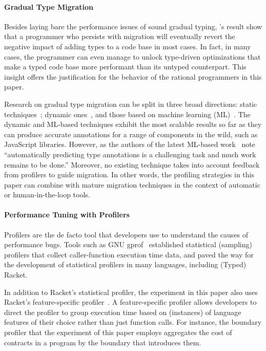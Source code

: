 \paragraph{Gradual Type Migration} Besides laying bare the performance
issues of sound gradual typing, \citet{gtnffvf-jfp-2019}'s result show
that a programmer who persists with migration will eventually revert the
negative impact of adding types to a code base in most cases. In fact, in
many cases, the programmer can even manage to unlock type-driven
optimizations that make a typed code base more performant than its untyped
counterpart. This insight offers the justification for the behavior of 
the rational programmers in this paper. 

Research on gradual type migration can be split in three broad directions:
static techniques~\cite{rch:in-out-infer-gt, km:ts-type-evo,
mp:gt-decidable, ccew:gt-migrate, gc:gt-infer,
cagg-solver-based-migration,clps-popl-2020,js-infer,ruby-static-infer,unif-infer};
dynamic
ones~\cite{msi:gt-infer-hm, dyn-infer-ruby, profile-guided-typing, gen-ts-decl, jstrace},
and those based on machine learning
(ML)~\cite{lambdanet,nl2ptype,learn-types-big-data,ml-ts}. The dynamic
and ML-based techniques exhibit the most scalable results so far as they
can produce accurate annotations for a range of components in the wild,
such as JavaScript libraries. However, as the authors of the latest
ML-based work~\cite{ml-ts} note ``automatically predicting type annotations is a
challenging task and much work remains to be done.'' Moreover, no existing
technique takes into account feedback from profilers to guide migration.
In other words,  the profiling strategies in this paper can combine
with mature migration techniques in the context of automatic or
human-in-the-loop tools.
 
\paragraph{Performance Tuning with Profilers} Profilers are the de facto
tool that developers use to understand the causes of performance bugs. 
Tools such as GNU gprof~\cite{gprof} established statistical (sampling) 
profilers that collect caller-function execution time data, and paved the
way for the development of statistical profilers in many languages,
including (Typed) Racket.

In addition to Racket's statistical profiler, the experiment in this paper
also uses Racket's feature-specific
profiler~\cite{astavf-feature-prf,staaf-feature-prf}. A feature-specific
profiler allows developers to direct the profiler to group execution time
based on (instances) of language features of their choice rather than just function calls.
For instance, the boundary profiler that the experiment of this paper
employs aggregates the cost of contracts in a program by the boundary that
introduces them. 


